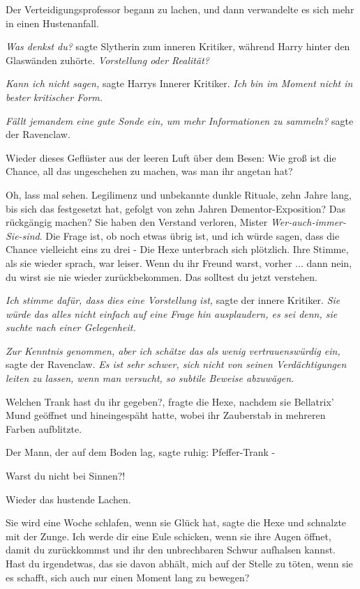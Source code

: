 Der Verteidigungsprofessor begann zu lachen, und dann verwandelte es sich mehr
in einen Hustenanfall.

\emph{Was denkst du?} sagte Slytherin zum inneren Kritiker, während Harry hinter
den Glaswänden zuhörte. \emph{Vorstellung oder Realität?}

\emph{Kann ich nicht sagen,} sagte Harrys Innerer Kritiker. \emph{Ich bin im
Moment nicht in bester kritischer Form.}

\emph{Fällt jemandem eine gute Sonde ein, um mehr Informationen zu sammeln?}
sagte der Ravenclaw.

Wieder dieses Geflüster aus der leeren Luft über dem Besen: \glqq{}Wie groß ist
die Chance, all das ungeschehen zu machen, was man ihr angetan hat?\grqq{}

\glqq{}Oh, lass mal sehen. Legilimenz und unbekannte dunkle Rituale, zehn Jahre
lang, bis sich das festgesetzt hat, gefolgt von zehn Jahren Dementor-Exposition?
Das rückgängig machen? Sie haben den Verstand verloren, Mister \glqq{}
\emph{Wer-auch-immer-Sie-sind}\grqq{}. Die Frage ist, ob noch etwas übrig ist,
und ich würde sagen, dass die Chance vielleicht eins zu drei -\grqq{} Die Hexe
unterbrach sich plötzlich. Ihre Stimme, als sie wieder sprach, war leiser. \glqq{}
Wenn du ihr Freund warst, vorher ... dann nein, du wirst sie nie wieder
zurückbekommen. Das solltest du jetzt verstehen.\grqq{}

\emph{Ich stimme dafür, dass dies eine Vorstellung ist,} sagte der innere
Kritiker. \emph{Sie würde das alles nicht einfach auf eine Frage hin
ausplaudern, es sei denn, sie suchte nach einer Gelegenheit.}

\emph{Zur Kenntnis genommen, aber ich schätze das als wenig vertrauenswürdig
ein,} sagte der Ravenclaw. \emph{Es ist sehr schwer, sich nicht von seinen
Verdächtigungen leiten zu lassen, wenn man versucht, so subtile Beweise
abzuwägen.}

\glqq{}Welchen Trank hast du ihr gegeben?\grqq{}, fragte die Hexe, nachdem sie
Bellatrix' Mund geöffnet und hineingespäht hatte, wobei ihr Zauberstab in
mehreren Farben aufblitzte.

Der Mann, der auf dem Boden lag, sagte ruhig: \glqq{}Pfeffer-Trank -\grqq{}

\glqq{}Warst du nicht bei Sinnen?!\grqq{}

Wieder das hustende Lachen.

\glqq{}Sie wird eine Woche schlafen, wenn sie Glück hat\grqq{}, sagte die Hexe
und schnalzte mit der Zunge. \glqq{}Ich werde dir eine Eule schicken, wenn sie
ihre Augen öffnet, damit du zurückkommst und ihr den unbrechbaren Schwur
aufhalsen kannst. Hast du irgendetwas, das sie davon abhält, mich auf der Stelle
zu töten, wenn sie es schafft, sich auch nur einen Moment lang zu
bewegen?\grqq{}


